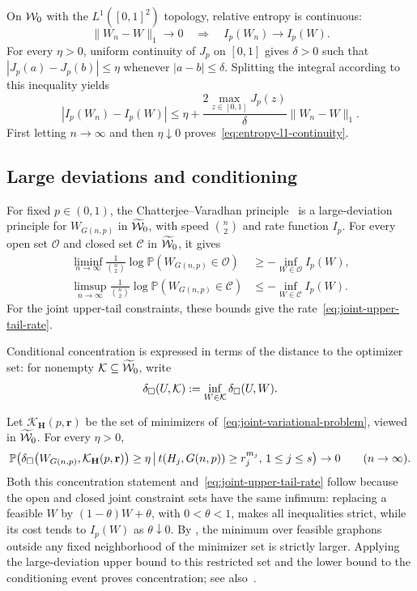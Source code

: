 On $\mathcal W_0$ with the $L^1([0,1]^2)$ topology, relative entropy is continuous:
\begin{equation}\label{eq:entropy-l1-continuity}
  \|W_n-W\|_1\longrightarrow0
  \quad\Longrightarrow\quad I_p(W_n)\longrightarrow I_p(W).
\end{equation}
For every $\eta>0$, uniform continuity of $J_p$ on $[0,1]$ gives
$\delta>0$ such that $|J_p(a)-J_p(b)|\le\eta$ whenever $|a-b|\le\delta$.
Splitting the integral according to this inequality yields
\[
  |I_p(W_n)-I_p(W)|
  \le\eta+\frac{2\max_{z\in[0,1]}J_p(z)}{\delta}\|W_n-W\|_1.
\]
First letting $n\to\infty$ and then $\eta\downarrow0$
proves~\eqref{eq:entropy-l1-continuity}.

\subsection{Large deviations and conditioning}\label{sec:large-deviations}

For fixed $p\in(0,1)$, the Chatterjee--Varadhan
principle~\cite{ChatterjeeVaradhanLDP} is a large-deviation principle for
$W_{G(n,p)}$ in $\widetilde{\mathcal W}_0$, with speed $\binom n2$ and rate function
$I_p$.  For every open set $\mathcal O$ and closed set $\mathcal C$ in
$\widetilde{\mathcal W}_0$, it gives
\begin{align*}
  \liminf_{n\to\infty}\frac1{\binom n2}
    \log\mathbb P(W_{G(n,p)}\in\mathcal O)
    &\ge-\inf_{W\in\mathcal O}I_p(W),\\
  \limsup_{n\to\infty}\frac1{\binom n2}
    \log\mathbb P(W_{G(n,p)}\in\mathcal C)
    &\le-\inf_{W\in\mathcal C}I_p(W).
\end{align*}
For the joint upper-tail constraints, these bounds give the
rate~\eqref{eq:joint-upper-tail-rate}.

Conditional concentration is expressed in terms of the distance to the
optimizer set: for nonempty $\mathcal K\subseteq\widetilde{\mathcal W}_0$, write
\[
  \delta_\square(U,\mathcal K):=\inf_{W\in\mathcal K}\delta_\square(U,W).
\]

Let $\mathcal K_{\mathbf H}(p,\mathbf r)$ be the set of minimizers
of~\eqref{eq:joint-variational-problem}, viewed in $\widetilde{\mathcal W}_0$.
For every $\eta>0$,
\begin{equation*}
  \mathbb P\!\left(
    \delta_\square\bigl(W_{G(n,p)},\mathcal K_{\mathbf H}(p,\mathbf r)\bigr)\ge\eta
    \,\middle|\,
    t(H_j,G(n,p))\ge r_j^{m_j},\, 1\le j\le s
  \right)\rightarrow0
  \qquad (n\to\infty).
\end{equation*}
Both this concentration statement and~\eqref{eq:joint-upper-tail-rate}
follow because the open and closed joint constraint sets have the same
infimum:
replacing a feasible $W$ by $(1-\theta)W+\theta$, with $0<\theta<1$, makes
all inequalities strict, while its cost tends to $I_p(W)$ as $\theta\downarrow0$.
By , the minimum over feasible graphons
outside any fixed neighborhood of the minimizer set is strictly larger.
Applying the large-deviation upper bound to this restricted set and the
lower bound to the conditioning event proves concentration; see
also~\cite[Theorem~3.1 and its proof]{ChatterjeeVaradhanLDP}.


